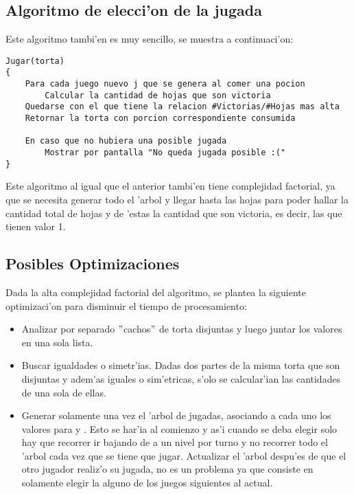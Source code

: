 \documentclass[spanish, a4paper, 10pt, titlepage]{article}
\begin{document}
\subsection{Algoritmo de elecci'on de la jugada}

Este algoritmo tambi'en es muy sencillo, se muestra a continuaci'on:

\begin{verbatim}
Jugar(torta)
{
    Para cada juego nuevo j que se genera al comer una pocion
        Calcular la cantidad de hojas que son victoria
    Quedarse con el que tiene la relacion #Victorias/#Hojas mas alta
    Retornar la torta con porcion correspondiente consumida

    En caso que no hubiera una posible jugada
        Mostrar por pantalla "No queda jugada posible :("
}
\end{verbatim}

Este algoritmo al igual que el anterior tambi'en tiene complejidad factorial, ya que se necesita generar todo el 'arbol y llegar hasta las hojas para poder hallar la cantidad total de hojas y de 'estas la cantidad que son victoria, es decir, las que tienen valor 1.

\subsection{Posibles Optimizaciones}

Dada la alta complejidad factorial del algoritmo, se plantea la siguiente optimizaci'on para disminuir el tiempo de procesamiento:

\begin{itemize}
\item Analizar por separado $"$cachos$"$ de torta disjuntas y luego juntar los valores en una sola lista.
\item Buscar igualdades o simetr'ias. Dadas dos partes de la misma torta que son disjuntas y adem'as iguales o sim'etricas, s'olo se calcular'ian las cantidades de una sola de ellas.
\item Generar solamente una vez el 'arbol de jugadas, asociando a cada uno los valores para  y . Esto se har'ia al comienzo y as'i cuando se deba elegir solo hay que recorrer ir bajando de a un nivel por turno y no recorrer todo el 'arbol cada vez que se tiene que jugar. Actualizar el 'arbol despu'es de que el otro jugador realiz'o su jugada, no es un problema ya que consiste en solamente elegir la alguno de los juegos siguientes al actual.
\end{itemize}


\clearpage
\end{document}
